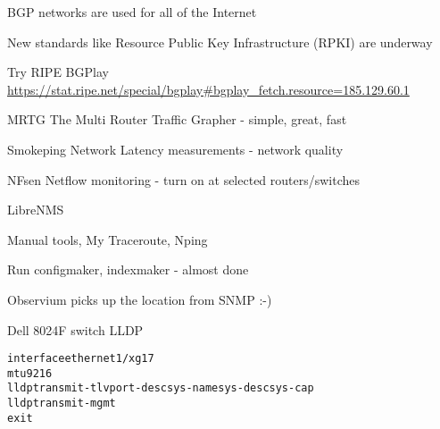 \documentclass[Screen16to9,17pt]{foils}
\begin{document}
\begin{list2}
\item BGP networks are used for all of the Internet
\item New standards like Resource Public Key Infrastructure (RPKI) are underway
\item Try RIPE BGPlay \url{https://stat.ripe.net/special/bgplay#bgplay_fetch.resource=185.129.60.1}
\end{list2}




\begin{slidelist}
\item MRTG The Multi Router Traffic Grapher - simple, great, fast\\
\item Smokeping Network Latency measurements - network quality\\
\item NFsen Netflow monitoring - turn on at selected routers/switches
\item LibreNMS 
\item Manual tools, My Traceroute, Nping
\end{slidelist}



\centerline{Run configmaker, indexmaker - almost done}








\centerline{Observium picks up the location from SNMP :-)}


Dell 8024F switch LLDP


\begin{alltt}\small
interface ethernet 1/xg17
mtu 9216
lldp transmit-tlv port-desc sys-name sys-desc sys-cap
lldp transmit-mgmt
exit
\end{alltt}
\end{document}
